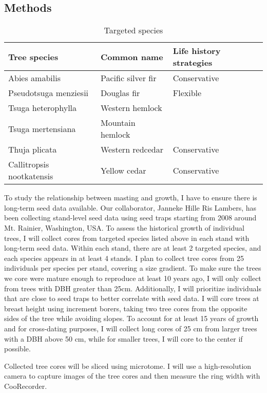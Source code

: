 \documentclass[11pt,letter]{article}
\begin{document}
\subsection{Methods}
\begin{table}[htb]
	\centering
	\small
	\caption{Targeted species}
\begin{tabular}{|p{5cm}|p{5cm}|p{5cm}|}
\hline
 Tree species & Common name & Life history strategies\\ \hline %
Abies amabilis & Pacific silver fir & Conservative \\ \hline
Pseudotsuga menziesii & Douglas fir & Flexible    \\\hline
Tsuga heterophylla & Western hemlock &     \\\hline
Tsuga mertensiana & Mountain hemlock &     \\\hline
Thuja plicata & Western redcedar & Conservative    \\\hline
Callitropsis nootkatensis & Yellow cedar & Conservative    \\\hline

\end{tabular}

\end{table}
To study the relationship between masting and growth, I have to ensure there is long-term seed data available. Our collaborator, Janneke Hille Ris Lambers, has been collecting stand-level seed data using seed traps starting from 2008 around Mt. Rainier, Washington, USA. To assess the historical growth of individual trees, I will collect cores from targeted species listed above in each stand with long-term seed data. Within each stand, there are at least 2 targeted species, and each species appears in at least 4 stands. I plan to collect tree cores from 25 individuals per species per stand, covering a size gradient. To make sure the trees we core were mature enough to reproduce at least 10 years ago, I will only collect from trees with DBH greater than 25cm. Additionally, I will prioritize individuals that are close to seed traps to better correlate with seed data. I will core trees at breast height using increment borers, taking two tree cores from the opposite sides of the tree while avoiding slopes. To account for at least 15 years of growth and for cross-dating purposes, I will collect long cores of 25 cm from larger trees with a DBH above 50 cm, while for smaller trees, I will core to the center if possible.

Collected tree cores will be sliced using microtome. I  will use a high-resolution camera to capture images of the tree cores and then measure the ring width with CooRecorder.
\end{document}
